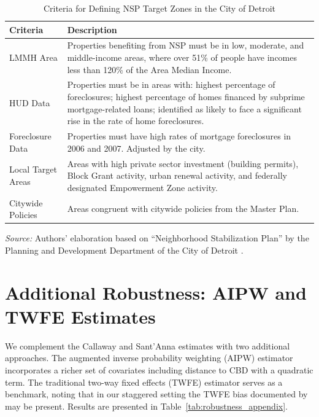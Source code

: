 \documentclass[12pt,authoryear]{elsarticle}
\begin{document}
\begin{table}[H]
\centering
\caption{Criteria for Defining NSP Target Zones in the City of Detroit}
\label{tab:selection_criteria}
\begin{threeparttable}
\small
\begin{tabularx}{\textwidth}{lX}
\toprule
Criteria & Description \\
\midrule
LMMH Area & Properties benefiting from NSP must be in low, moderate, and middle-income areas, where over 51\% of people have incomes less than 120\% of the Area Median Income. \\
\addlinespace
HUD Data & Properties must be in areas with: highest percentage of foreclosures; highest percentage of homes financed by subprime mortgage-related loans; identified as likely to face a significant rise in the rate of home foreclosures. \\
\addlinespace
Foreclosure Data & Properties must have high rates of mortgage foreclosures in 2006 and 2007. Adjusted by the city. \\
\addlinespace
Local Target Areas & Areas with high private sector investment (building permits), Block Grant activity, urban renewal activity, and federally designated Empowerment Zone activity. \\
\addlinespace
Citywide Policies & Areas congruent with citywide policies from the Master Plan. \\
\bottomrule
\end{tabularx}
\begin{tablenotes}[flushleft]
\footnotesize
\item \textit{Source:} Authors' elaboration based on ``Neighborhood Stabilization Plan'' by the Planning and Development Department of the City of Detroit \citep{pdd2009}.
\end{tablenotes}
\end{threeparttable}
\end{table}


\section{Additional Robustness: AIPW and TWFE Estimates}
\label{app:robustness}

We complement the Callaway and Sant'Anna estimates with two additional approaches. The augmented inverse probability weighting (AIPW) estimator \citep{wooldridge2023} incorporates a richer set of covariates including distance to CBD with a quadratic term. The traditional two-way fixed effects (TWFE) estimator serves as a benchmark, noting that in our staggered setting the TWFE bias documented by \citet{goodmanbacon2021} may be present. Results are presented in Table~\ref{tab:robustness_appendix}.
\end{document}
